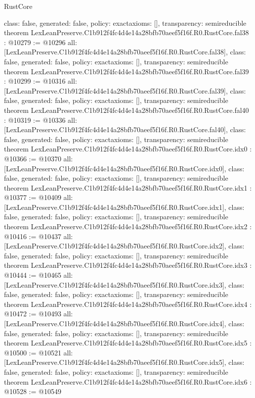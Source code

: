 \begin{lexlean}{RustCore}
\begin{coremodule}
{  class: false,
  generated: false,
  policy: exact{axioms: []},
  transparency: semireducible
}
theorem LexLeanPreserve.C1b912f4fc4d4e14a28bfb70aeef5f16f.R0.RustCore.fal38 : @10279 := @10296 {
  all: [LexLeanPreserve.C1b912f4fc4d4e14a28bfb70aeef5f16f.R0.RustCore.fal38],
  class: false,
  generated: false,
  policy: exact{axioms: []},
  transparency: semireducible
}
theorem LexLeanPreserve.C1b912f4fc4d4e14a28bfb70aeef5f16f.R0.RustCore.fal39 : @10299 := @10316 {
  all: [LexLeanPreserve.C1b912f4fc4d4e14a28bfb70aeef5f16f.R0.RustCore.fal39],
  class: false,
  generated: false,
  policy: exact{axioms: []},
  transparency: semireducible
}
theorem LexLeanPreserve.C1b912f4fc4d4e14a28bfb70aeef5f16f.R0.RustCore.fal40 : @10319 := @10336 {
  all: [LexLeanPreserve.C1b912f4fc4d4e14a28bfb70aeef5f16f.R0.RustCore.fal40],
  class: false,
  generated: false,
  policy: exact{axioms: []},
  transparency: semireducible
}
theorem LexLeanPreserve.C1b912f4fc4d4e14a28bfb70aeef5f16f.R0.RustCore.idx0 : @10366 := @10370 {
  all: [LexLeanPreserve.C1b912f4fc4d4e14a28bfb70aeef5f16f.R0.RustCore.idx0],
  class: false,
  generated: false,
  policy: exact{axioms: []},
  transparency: semireducible
}
theorem LexLeanPreserve.C1b912f4fc4d4e14a28bfb70aeef5f16f.R0.RustCore.idx1 : @10377 := @10409 {
  all: [LexLeanPreserve.C1b912f4fc4d4e14a28bfb70aeef5f16f.R0.RustCore.idx1],
  class: false,
  generated: false,
  policy: exact{axioms: []},
  transparency: semireducible
}
theorem LexLeanPreserve.C1b912f4fc4d4e14a28bfb70aeef5f16f.R0.RustCore.idx2 : @10416 := @10437 {
  all: [LexLeanPreserve.C1b912f4fc4d4e14a28bfb70aeef5f16f.R0.RustCore.idx2],
  class: false,
  generated: false,
  policy: exact{axioms: []},
  transparency: semireducible
}
theorem LexLeanPreserve.C1b912f4fc4d4e14a28bfb70aeef5f16f.R0.RustCore.idx3 : @10444 := @10465 {
  all: [LexLeanPreserve.C1b912f4fc4d4e14a28bfb70aeef5f16f.R0.RustCore.idx3],
  class: false,
  generated: false,
  policy: exact{axioms: []},
  transparency: semireducible
}
theorem LexLeanPreserve.C1b912f4fc4d4e14a28bfb70aeef5f16f.R0.RustCore.idx4 : @10472 := @10493 {
  all: [LexLeanPreserve.C1b912f4fc4d4e14a28bfb70aeef5f16f.R0.RustCore.idx4],
  class: false,
  generated: false,
  policy: exact{axioms: []},
  transparency: semireducible
}
theorem LexLeanPreserve.C1b912f4fc4d4e14a28bfb70aeef5f16f.R0.RustCore.idx5 : @10500 := @10521 {
  all: [LexLeanPreserve.C1b912f4fc4d4e14a28bfb70aeef5f16f.R0.RustCore.idx5],
  class: false,
  generated: false,
  policy: exact{axioms: []},
  transparency: semireducible
}
theorem LexLeanPreserve.C1b912f4fc4d4e14a28bfb70aeef5f16f.R0.RustCore.idx6 : @10528 := @10549 {
}
\end{coremodule}
\end{lexlean}
